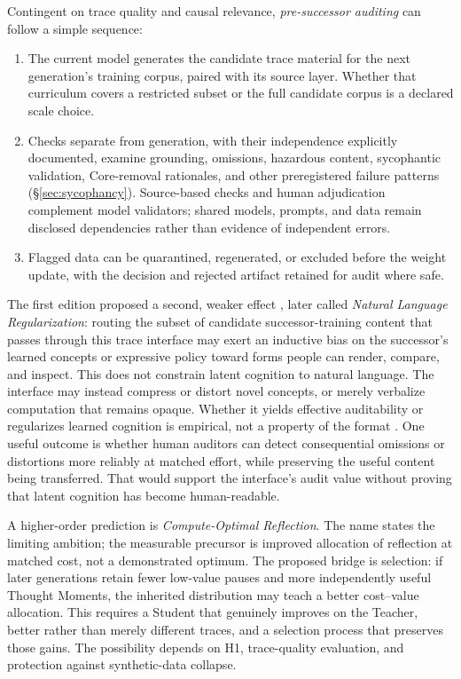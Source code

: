 \documentclass[11pt]{article}
\begin{document}
			Contingent on trace quality and causal relevance, \emph{pre-successor auditing} can follow a simple sequence:
			\begin{enumerate}
				\item The current model generates the candidate trace material for the next
generation's training corpus, paired with its source layer. Whether that
curriculum covers a restricted subset or the full candidate corpus is a
declared scale choice.
				\item Checks separate from generation, with their independence explicitly
documented, examine
grounding, omissions, hazardous content, sycophantic validation, Core-removal
rationales, and other preregistered failure patterns (\S\ref{sec:sycophancy}).
Source-based checks and human adjudication complement model validators; shared
models, prompts, and data remain disclosed dependencies rather than evidence
of independent errors.
				\item Flagged data can be quarantined, regenerated, or excluded before the weight update, with the decision and rejected artifact retained for audit where safe.
			\end{enumerate}

			The first edition proposed a second, weaker effect
			\cite{westerberg2025superintelligence}, later called
			\emph{Natural Language Regularization}: routing the subset of candidate
			successor-training content that passes through this trace interface may
			exert an inductive bias on the successor's learned concepts or expressive
			policy toward forms people can render, compare, and inspect. This does not
			constrain latent cognition to natural language. The interface may instead
			compress or distort novel concepts, or merely verbalize computation that
			remains opaque. Whether it yields effective auditability or regularizes
			learned cognition is empirical, not a property of the format
			\cite{westerberg2026entangled}. One useful outcome is whether human
auditors can detect consequential omissions or distortions more reliably at
matched effort, while preserving the useful content being transferred. That
would support the interface's audit value without proving that latent cognition
has become human-readable.

				A higher-order prediction is \emph{Compute-Optimal Reflection}. The name
				states the limiting ambition; the measurable precursor is improved
				allocation of reflection at matched cost, not a demonstrated optimum.
				The proposed bridge is selection: if later generations retain fewer low-value
				pauses and more independently useful Thought Moments, the inherited
				distribution may teach a better cost--value allocation. This requires a
				Student that genuinely improves on the Teacher, better rather than merely
				different traces, and a selection process that preserves those gains. The
				possibility depends on H1, trace-quality evaluation, and protection against
				synthetic-data collapse.
\end{document}
